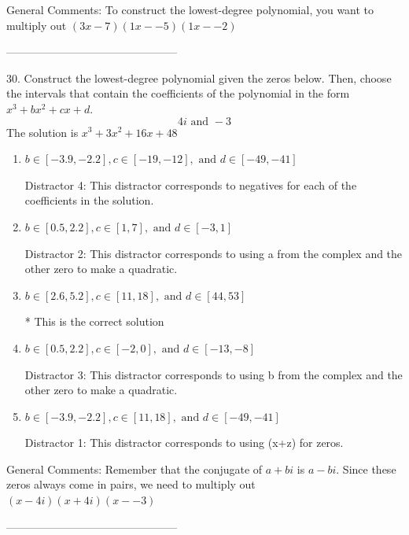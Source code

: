\documentclass{article}[10pt]
\begin{document}
General Comments: To construct the lowest-degree polynomial, you want to multiply out $(3x-7)(1x--5)(1x--2)$

-----------------------------------------------

30. Construct the lowest-degree polynomial given the zeros below. Then, choose the intervals that contain the coefficients of the polynomial in the form $x^3+bx^2+cx+d$.
$$ 4i \text{ and } -3 $$ 
The solution is $ x^3 + 3 x^2 + 16 x + 48 $ 

\begin{enumerate}[label=\Alph*.] 
\item $ b \in [-3.9, -2.2], c \in [-19, -12], \text{ and } d \in [-49, -41] $ 

  Distractor 4: This distractor corresponds to negatives for each of the coefficients in the solution. 
\item $ b \in [0.5, 2.2], c \in [1, 7], \text{ and } d \in [-3, 1] $ 

  Distractor 2: This distractor corresponds to using a from the complex and the other zero to make a quadratic. 
\item $ b \in [2.6, 5.2], c \in [11, 18], \text{ and } d \in [44, 53] $ 

 * This is the correct solution 
\item $ b \in [0.5, 2.2], c \in [-2, 0], \text{ and } d \in [-13, -8] $ 

  Distractor 3: This distractor corresponds to using b from the complex and the other zero to make a quadratic. 
\item $ b \in [-3.9, -2.2], c \in [11, 18], \text{ and } d \in [-49, -41] $ 

  Distractor 1: This distractor corresponds to using (x+z) for zeros. 
\end{enumerate} 
 
General Comments: Remember that the conjugate of $a+bi$ is $a-bi$. Since these zeros always come in pairs, we need to multiply out $(x-4i)(x+4i)(x--3)$

-----------------------------------------------
\end{document}
